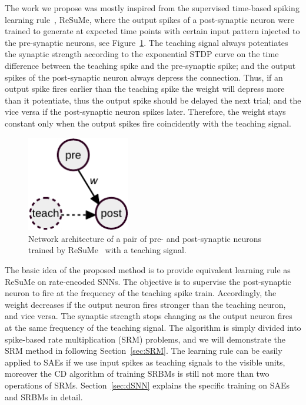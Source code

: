 The work we propose was mostly inspired from the supervised time-based spiking learning rule~\cite{ponulak2010supervised}, ReSuMe, where the output spikes of a post-synaptic neuron were trained to generate at expected time points with certain input pattern injected to the pre-synaptic neurons, see Figure~\ref{fig:resume}.
The teaching signal always potentiates the synaptic strength according to the exponential STDP curve on the time difference between the teaching spike and the pre-synaptic spike; and the output spikes of the post-synaptic neuron always depress the connection.
Thus, if an output spike fires earlier than the teaching spike the weight will depress more than it potentiate, thus the output spike should be delayed the next trial; and the vice versa if the post-synaptic neuron spikes later.
Therefore, the weight stays constant only when the output spikes fire coincidently with the teaching signal.
\begin{figure}
	\centering
	\includegraphics[width=0.4\textwidth]{pics_sdlm/ReSuMe.pdf}
	\caption{Network architecture of a pair of pre- and post-synaptic neurons trained by ReSuMe~\cite{ponulak2010supervised} with a teaching signal.}
	\label{fig:resume}
\end{figure}

The basic idea of the proposed method is to provide equivalent learning rule as ReSuMe on rate-encoded SNNs.
The objective is to supervise the post-synaptic neuron to fire at the frequency of the teaching spike train. 
Accordingly, the weight decreases if the output neuron fires stronger than the teaching neuron, and vice versa.
The synaptic strength stops changing as the output neuron fires at the same frequency of the teaching signal.
The algorithm is simply divided into spike-based rate multiplication (SRM) problems, and we will demonstrate the SRM method in following Section~\ref{sec:SRM}.
The learning rule can be easily applied to SAEs if we use input spikes as teaching signals to the visible units, moreover the CD algorithm of training SRBMs is still not more than two operations of SRMs.
Section~\ref{sec:dSNN} explains the specific training on SAEs and SRBMs in detail.
 

